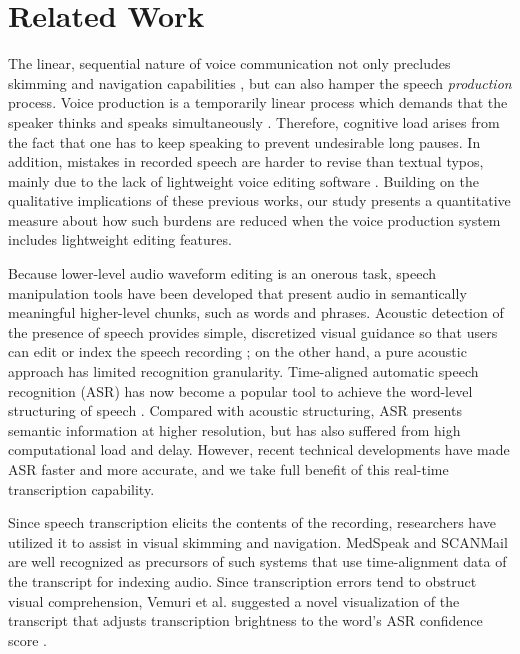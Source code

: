 \section{Related Work}

The linear, sequential nature of voice communication not only precludes skimming and navigation capabilities \cite{grudin}, but can also hamper the speech \emph{production} process. 
Voice production is a temporarily linear process which demands that the speaker thinks and speaks simultaneously \cite{marriott2002, yoon:2015}.
Therefore, cognitive load arises from the fact that one has to keep speaking to prevent undesirable long pauses. 
In addition, mistakes in recorded speech are harder to revise than textual typos, mainly due to the lack of lightweight voice editing software \cite{marriott2002}.  
Building on the qualitative implications of these previous works, our study presents a quantitative measure about how such burdens are reduced when the voice production system includes lightweight editing features.

Because lower-level audio waveform editing is an onerous task, speech manipulation tools have been developed that present audio in semantically meaningful higher-level chunks, such as words and phrases.
Acoustic detection of the presence of speech provides simple, discretized visual guidance so that users can edit or index the speech recording \cite{ades1986, hindus:1992}; on the other hand, a pure acoustic approach has limited recognition granularity. %
Time-aligned automatic speech recognition (ASR) has now become a popular tool to achieve the word-level structuring of speech \cite{Schmandt81, Wilcox:1992}. 
Compared with acoustic structuring, ASR presents semantic information at higher resolution, but has also suffered from high computational load and delay. 
However, recent technical developments have made ASR faster and more accurate, and we take full benefit of this real-time transcription capability.

Since speech transcription elicits the contents of the recording, researchers have utilized it to assist in visual skimming and navigation. 
MedSpeak \cite{Lai:1997} and SCANMail \cite{whittaker} are well recognized as precursors of such systems that use time-alignment data of the transcript for indexing audio. 
Since transcription errors tend to obstruct visual comprehension, Vemuri et al. suggested a novel visualization of the transcript that adjusts transcription brightness to the word's ASR confidence score \cite{Vemuri:2004}. 

